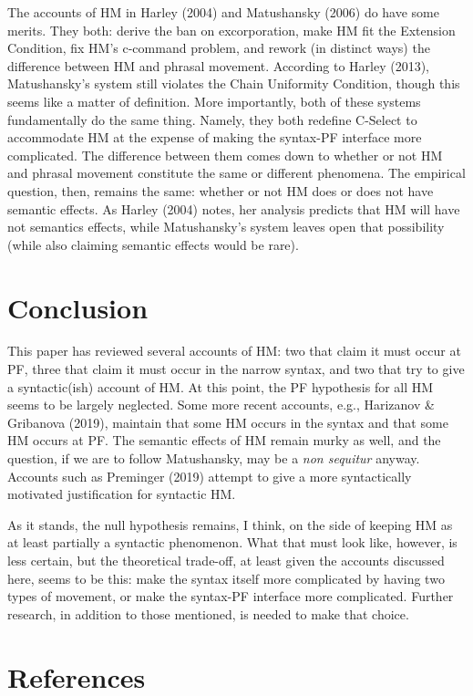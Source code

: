 \documentclass[]{ling-200b-2}
\begin{document}
The accounts of HM in Harley (2004) and Matushansky (2006) do have some merits. They both: derive the ban on excorporation, make HM fit the Extension Condition, fix HM's c-command problem, and rework (in distinct ways) the difference between HM and phrasal movement. According to Harley (2013), Matushansky's system still violates the Chain Uniformity Condition, though this seems like a matter of definition. More importantly, both of these systems fundamentally do the same thing. Namely, they both redefine C-Select to accommodate HM at the expense of making the syntax-PF interface more complicated. The difference between them comes down to whether or not HM and phrasal movement constitute the same or different phenomena. The empirical question, then, remains the same: whether or not HM does or does not have semantic effects. As Harley (2004) notes, her analysis predicts that HM will have not semantics effects, while Matushansky's system leaves open that possibility (while also claiming semantic effects would be rare).

\section{Conclusion}

This paper has reviewed several accounts of HM: two that claim it must occur at PF, three that claim it must occur in the narrow syntax, and two that try to give a syntactic(ish) account of HM. At this point, the PF hypothesis for all HM seems to be largely neglected. Some more recent accounts, e.g., Harizanov \& Gribanova (2019), maintain that some HM occurs in the syntax and that some HM occurs at PF. The semantic effects of HM remain murky as well, and the question, if we are to follow Matushansky, may be a \textit{non sequitur} anyway. Accounts such as Preminger (2019) attempt to give a more syntactically motivated justification for syntactic HM.

As it stands, the null hypothesis remains, I think, on the side of keeping HM as at least partially a syntactic phenomenon. What that must look like, however, is less certain, but the theoretical trade-off, at least given the accounts discussed here, seems to be this: make the syntax itself  more complicated by having two types of movement, or make the syntax-PF interface more complicated. Further research, in addition to those mentioned, is needed to make that choice.

\section{References}
\end{document}
